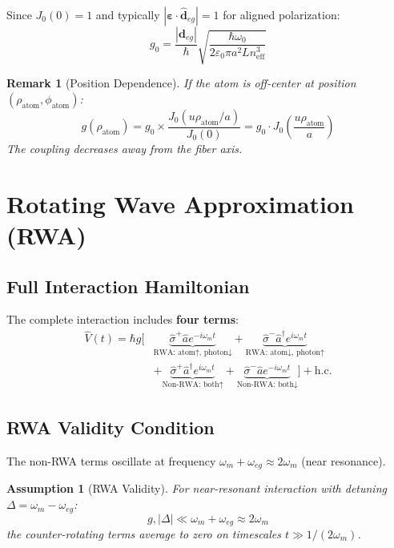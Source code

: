 \documentclass[12pt,a4paper]{article}
\newtheorem{remark}{Remark}
\newtheorem{assumption}{Assumption}
\begin{document}
Since $J_0(0) = 1$ and typically $|\boldsymbol{\varepsilon} \cdot \hat{\mathbf{d}}_{eg}| = 1$ for aligned polarization:
\begin{equation}
g_0 = \frac{|\mathbf{d}_{eg}|}{\hbar} \sqrt{\frac{\hbar\omega_0}{2\varepsilon_0 \pi a^2 L n_{\text{eff}}^3}} \label{eq:g0_simplified}
\end{equation}

\begin{remark}[Position Dependence]
If the atom is off-center at position $(\rho_{\text{atom}}, \phi_{\text{atom}})$:
\begin{equation}
g(\rho_{\text{atom}}) = g_0 \times \frac{J_0(u\rho_{\text{atom}}/a)}{J_0(0)} = g_0 \cdot J_0\left(\frac{u\rho_{\text{atom}}}{a}\right)
\end{equation}
The coupling decreases away from the fiber axis.
\end{remark}

\section{Rotating Wave Approximation (RWA)}

\subsection{Full Interaction Hamiltonian}

The complete interaction includes \textbf{four terms}:
\begin{align}
\hat{V}(t) = \hbar g \Big[&\underbrace{\hat{\sigma}^+ \hat{a} e^{-i\omega_m t}}_{\text{RWA: atom↑, photon↓}} + \underbrace{\hat{\sigma}^- \hat{a}^\dagger e^{i\omega_m t}}_{\text{RWA: atom↓, photon↑}} \nonumber\\
&+ \underbrace{\hat{\sigma}^+ \hat{a}^\dagger e^{i\omega_m t}}_{\text{Non-RWA: both↑}} + \underbrace{\hat{\sigma}^- \hat{a} e^{-i\omega_m t}}_{\text{Non-RWA: both↓}}\Big] + \text{h.c.} \label{eq:V_four_terms}
\end{align}

\subsection{RWA Validity Condition}

The non-RWA terms oscillate at frequency $\omega_m + \omega_{eg} \approx 2\omega_m$ (near resonance). 

\begin{assumption}[RWA Validity]
For near-resonant interaction with detuning $\Delta = \omega_m - \omega_{eg}$:
\begin{equation}
g, |\Delta| \ll \omega_m + \omega_{eg} \approx 2\omega_m
\end{equation}
the counter-rotating terms average to zero on timescales $t \gg 1/(2\omega_m)$.
\end{assumption}
\end{document}
